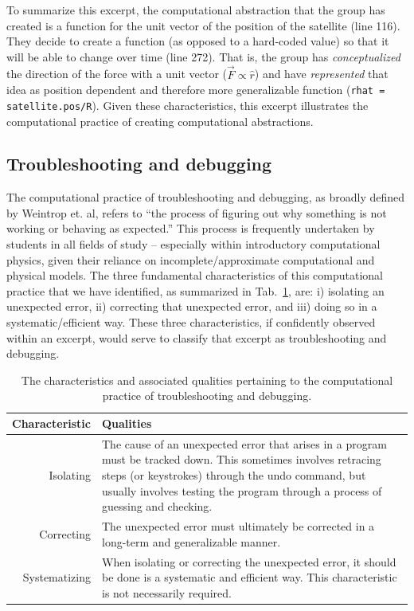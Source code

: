 \documentclass{msuphddissertation}
\begin{document}
\begin{doublespace}
To summarize this excerpt, the computational abstraction that the group has created is a function for the unit vector of the position of the satellite (line 116).  They decide to create a function (as opposed to a hard-coded value) so that it will be able to change over time (line 272).  That is, the group has \textit{conceptualized} the direction of the force with a unit vector ($\vec{F}\propto\hat{r}$) and have \textit{represented} that idea as position dependent and therefore more generalizable function (\texttt{rhat = satellite.pos/R}).  Given these characteristics, this excerpt illustrates the computational practice of creating computational abstractions.

%
%
%
%
%
%
%
%
%
%
%
%
%
%
%
%

\subsection{Troubleshooting and debugging}

The computational practice of troubleshooting and debugging, as broadly defined by Weintrop et. al, refers to ``the process of figuring out why something is not working or behaving as expected.''  This process is frequently undertaken by students in all fields of study -- especially within introductory computational physics, given their reliance on incomplete/approximate computational and physical models.  The three fundamental characteristics of this computational practice that we have identified, as summarized in Tab.~\ref{CH5:TroubleshootingAndDebugging}, are: i) isolating an unexpected error, ii) correcting that unexpected error, and iii) doing so in a systematic/efficient way.  These three characteristics, if confidently observed within an excerpt, would serve to classify that excerpt as troubleshooting and debugging.

\begin{table}
\begin{tabular}{r|p{}}
Characteristic & Qualities \\\hline\hline
Isolating & The cause of an unexpected error that arises in a program must be tracked down.  This sometimes involves retracing steps (or keystrokes) through the undo command, but usually involves testing the program through a process of guessing and checking.\\
Correcting & The unexpected error must ultimately be corrected in a long-term and generalizable manner.\\
Systematizing & When isolating or correcting the unexpected error, it should be done is a systematic and efficient way.  This characteristic is not necessarily required.\\
\end{tabular}\caption{The characteristics and associated qualities pertaining to the computational practice of troubleshooting and debugging.}\label{CH5:TroubleshootingAndDebugging}
\end{table}


\end{doublespace}
\end{document}
